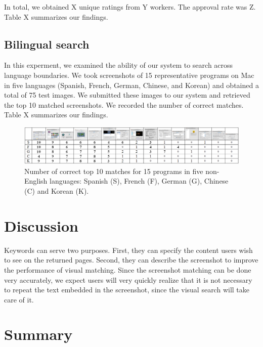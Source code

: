 \documentclass{www2010-submission}
\begin{document}
In total, we obtained X unique ratings from Y workers. The 
approval rate was Z. Table X summarizes our findings. 

\subsection{Bilingual search}

In this experment, we examined the ability of our system to search
across language boundaries. We took screenshots of 15 representative
programs on Mac in five languages (Spanish, French, German,
Chinese, and Korean) and obtained a total of 75 test
images.  We submitted these images to our 
system and retrieved the top 10 matched screenshots. We recorded
the number of correct matches. Table X summarizes
our findings.

\begin{figure}
\includegraphics[width=2\columnwidth]{figure/bilingual_search.png}
\caption{Number of correct top 10 matches for 15 programs in five non-English
languages: Spanish (S), French (F), German (G), Chinese (C) and Korean (K).}
\end{figure}


\section{Discussion}

Keywords can serve two purposes. First, they can specify the
content users wish to see on the returned pages. Second, they can
describe the screenshot to improve the performance of visual
matching. Since the screenshot matching can be done very
accurately, we expect users will very quickly realize that it is
not necessary to repeat the text embedded in the screenshot, since
the visual search will take care of it.


\section{Summary}



\balancecolumns %
\end{document}
